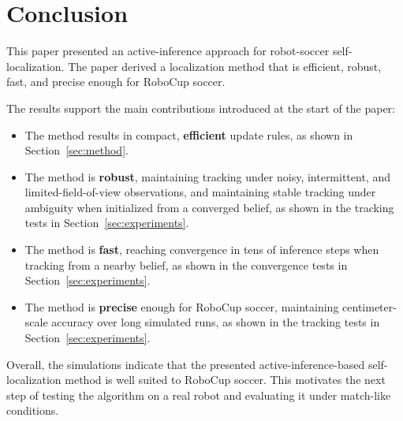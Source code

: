 \section{Conclusion}
\label{sec:conclusion}

This paper presented an active-inference approach for robot-soccer self-localization. The paper derived a localization method that is efficient, robust, fast, and precise enough for RoboCup soccer.

The results support the main contributions introduced at the start of the paper:
\begin{itemize}
    \item The method results in compact, \textbf{efficient} update rules, as shown in Section~\ref{sec:method}.
    \item The method is \textbf{robust}, maintaining tracking under noisy, intermittent, and limited-field-of-view observations, and maintaining stable tracking under ambiguity when initialized from a converged belief, as shown in the tracking tests in Section~\ref{sec:experiments}.
    \item The method is \textbf{fast}, reaching convergence in tens of inference steps when tracking from a nearby belief, as shown in the convergence tests in Section~\ref{sec:experiments}.   
    \item The method is \textbf{precise} enough for RoboCup soccer, maintaining centimeter-scale accuracy over long simulated runs, as shown in the tracking tests in Section~\ref{sec:experiments}.
\end{itemize}

Overall, the simulations indicate that the presented active-inference-based self-localization method is well suited to RoboCup soccer. This motivates the next step of testing the algorithm on a real robot and evaluating it under match-like conditions.
